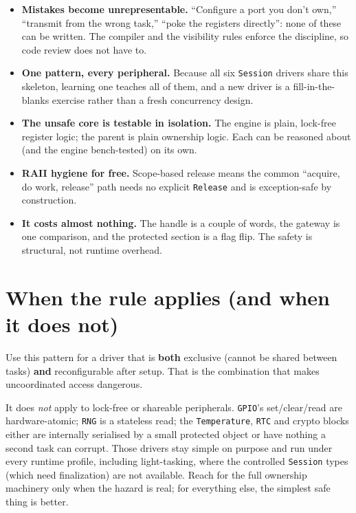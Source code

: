 \begin{itemize}
\item \textbf{Mistakes become unrepresentable.} ``Configure a port you don't
  own,'' ``transmit from the wrong task,'' ``poke the registers directly'':
  none of these can be written. The compiler and the visibility rules enforce
  the discipline, so code review does not have to.
\item \textbf{One pattern, every peripheral.} Because all six \texttt{Session}
  drivers share this skeleton, learning one teaches all of them, and a new driver
  is a fill-in-the-blanks exercise rather than a fresh concurrency design.
\item \textbf{The unsafe core is testable in isolation.} The engine is plain,
  lock-free register logic; the parent is plain ownership logic. Each can be
  reasoned about (and the engine bench-tested) on its own.
\item \textbf{RAII hygiene for free.} Scope-based release means the common
  ``acquire, do work, release'' path needs no explicit \texttt{Release} and is
  exception-safe by construction.
\item \textbf{It costs almost nothing.} The handle is a couple of words, the
  gateway is one comparison, and the protected section is a flag flip. The safety
  is structural, not runtime overhead.
\end{itemize}

\section{When the rule applies (and when it does not)}

Use this pattern for a driver that is \textbf{both} exclusive (cannot be shared
between tasks) \textbf{and} reconfigurable after setup. That is the combination
that makes uncoordinated access dangerous.

It does \emph{not} apply to lock-free or shareable peripherals. \texttt{GPIO}'s
set/clear/read are hardware-atomic; \texttt{RNG} is a stateless read; the
\texttt{Temperature}, \texttt{RTC} and crypto blocks either are internally
serialised by a small protected object or have nothing a second task can corrupt.
Those drivers stay simple on purpose and run under every runtime profile,
including light-tasking, where the controlled \texttt{Session} types (which need
finalization) are not available. Reach for the full ownership machinery only when
the hazard is real; for everything else, the simplest safe thing is better.

